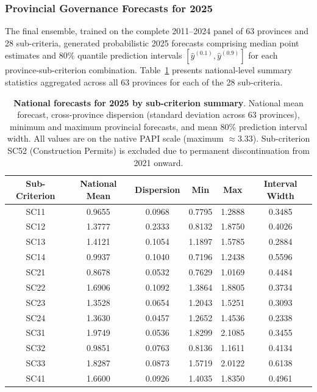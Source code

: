 \documentclass[12pt,a4paper]{article}
\begin{document}
\subsubsection{Provincial Governance Forecasts for 2025}

The final ensemble, trained on the complete 2011--2024 panel of 63 provinces and 28 sub-criteria, generated probabilistic 2025 forecasts comprising median point estimates and 80\% quantile prediction intervals $[\hat{y}^{(0.1)}, \hat{y}^{(0.9)}]$ for each province-sub-criterion combination. Table~\ref{tab:forecast_2025_summary} presents national-level summary statistics aggregated across all 63 provinces for each of the 28 sub-criteria.

\begin{table}[H]
\centering
\caption{\textbf{National forecasts for 2025 by sub-criterion summary}. National mean forecast, cross-province dispersion (standard deviation across 63 provinces), minimum and maximum provincial forecasts, and mean 80\% prediction interval width. All values are on the native PAPI scale (maximum $\approx 3.33$). Sub-criterion SC52 (Construction Permits) is excluded due to permanent discontinuation from 2021 onward.}
\label{tab:forecast_2025_summary}
\small
\begin{tabular}{cccccc}
\toprule
\textbf{Sub-Criterion} & \textbf{National Mean} & \textbf{Dispersion} & \textbf{Min} & \textbf{Max} & \textbf{Interval Width} \\
\midrule
SC11 & 0.9655 & 0.0968 & 0.7795 & 1.2888 & 0.3485 \\
SC12 & 1.3777 & 0.2333 & 0.8132 & 1.8750 & 0.4026 \\
SC13 & 1.4121 & 0.1054 & 1.1897 & 1.5785 & 0.2884 \\
SC14 & 0.9937 & 0.1040 & 0.7196 & 1.2438 & 0.5596 \\
SC21 & 0.8678 & 0.0532 & 0.7629 & 1.0169 & 0.4484 \\
SC22 & 1.6906 & 0.1092 & 1.3864 & 1.8805 & 0.3734 \\
SC23 & 1.3528 & 0.0654 & 1.2043 & 1.5251 & 0.3093 \\
SC24 & 1.3630 & 0.0457 & 1.2652 & 1.4536 & 0.2338 \\
SC31 & 1.9749 & 0.0536 & 1.8299 & 2.1085 & 0.3455 \\
SC32 & 0.9851 & 0.0763 & 0.8136 & 1.1611 & 0.4134 \\
SC33 & 1.8287 & 0.0873 & 1.5719 & 2.0122 & 0.6138 \\
SC41 & 1.6600 & 0.0926 & 1.4035 & 1.8350 & 0.4961 \\

\end{tabular}
\end{table}
\end{document}
